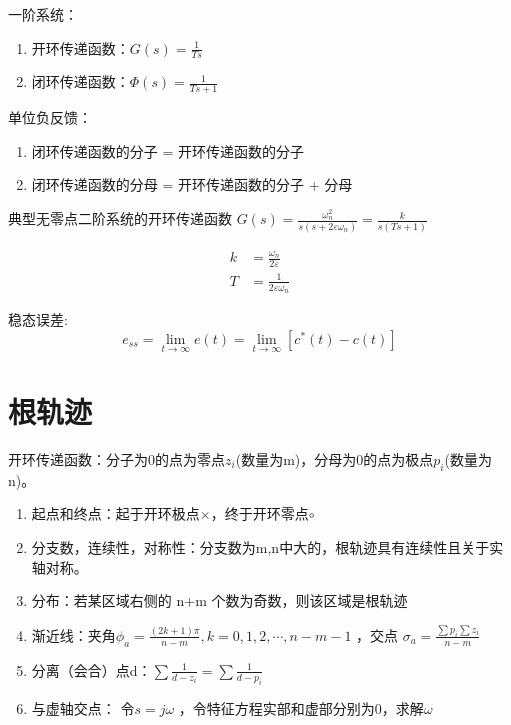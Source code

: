 \documentclass[UTF8]{ctexart}
\begin{document}
    一阶系统：
    \begin{enumerate}
        \item 开环传递函数：$G(s) = \frac{1}{Ts}$
        \item 闭环传递函数：$\Phi(s) = \frac{1}{Ts+1}$
    \end{enumerate}
    
    单位负反馈：
    \begin{enumerate}
        \item 闭环传递函数的分子 = 开环传递函数的分子
        \item 闭环传递函数的分母 = 开环传递函数的分子 + 分母
    \end{enumerate}

    典型无零点二阶系统的开环传递函数 $G(s) = \frac{\omega_n^2}{s(s+2\varepsilon\omega_n)} = \frac{k}{s(Ts+1)} $

    \begin{equation*}
        \begin{aligned}
        k &= \frac{\omega_n}{2\varepsilon}\\
        T &= \frac{1}{2\varepsilon\omega_n}
        \end{aligned}
    \end{equation*}

    稳态误差:
    \begin{equation*}
        e_{ss} = \lim_{t \to \infty} e(t) = \lim_{t \to \infty}[c^\ast  (t) -c(t)]
    \end{equation*}

    \section{根轨迹}

    \begin{tcolorbox}[green]
        开环传递函数：分子为0的点为零点$z_i$(数量为m)，分母为0的点为极点$p_i$(数量为n)。
    \end{tcolorbox}
    \begin{enumerate}
        \item 起点和终点：起于开环极点$\times$，终于开环零点$\circ$
        \item 分支数，连续性，对称性：分支数为m,n中大的，根轨迹具有连续性且关于实轴对称。
        \item 分布：若某区域右侧的 n+m 个数为奇数，则该区域是根轨迹
        \item 渐近线：夹角$\phi_a = \frac{(2k+1)\pi}{n-m} , k= 0,1,2,\cdots , n-m-1$ ，交点 $\sigma_a = \frac{\sum p_i \sum z_i}{n-m}$
        \item 分离（会合）点d：$\sum \frac{1}{d-z_i} = \sum \frac{1}{d-p_i}$
        \item 与虚轴交点： 令$s=j\omega$ ，令特征方程实部和虚部分别为0，求解$\omega$
    \end{enumerate}
\end{document}
